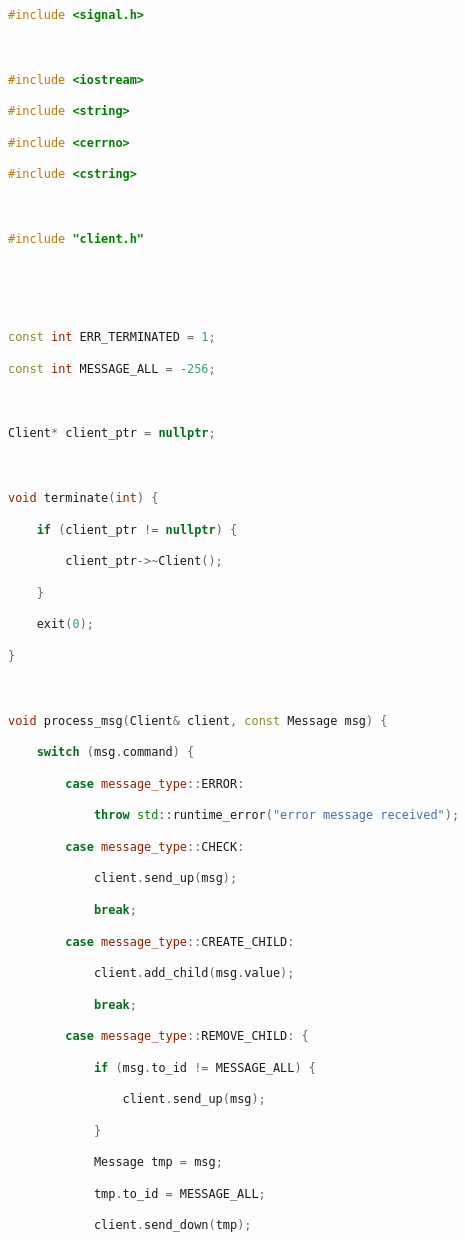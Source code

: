 \begin{lstlisting}[language=C++]

#include <signal.h>



#include <iostream>

#include <string>

#include <cerrno>

#include <cstring>



#include "client.h"





const int ERR_TERMINATED = 1;

const int MESSAGE_ALL = -256;



Client* client_ptr = nullptr;



void terminate(int) {

    if (client_ptr != nullptr) {

        client_ptr->~Client();

    }

    exit(0);

}



void process_msg(Client& client, const Message msg) {

    switch (msg.command) {

        case message_type::ERROR:

            throw std::runtime_error("error message received");

        case message_type::CHECK:

            client.send_up(msg);

            break;

        case message_type::CREATE_CHILD:

            client.add_child(msg.value);

            break;

        case message_type::REMOVE_CHILD: {

            if (msg.to_id != MESSAGE_ALL) {

                client.send_up(msg);

            }

            Message tmp = msg;

            tmp.to_id = MESSAGE_ALL;

            client.send_down(tmp);


\end{lstlisting}
